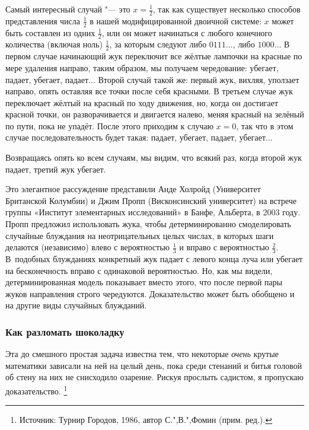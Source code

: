 \documentclass[twoside]{book}
\begin{document}
Самый интересный случай "--- это $x=\tfrac12$, так как существует несколько способов представления числа $\tfrac12$ в нашей модифицированной двоичной системе: $x$ может быть составлен из одних $\tfrac12$, или он может начинаться с любого конечного количества (включая ноль) $\tfrac12$, за которым следуют либо $0111\dots$, либо $1000\dots$
В первом случае начинающий жук переключит все жёлтые лампочки на красные по мере удаления направо, таким образом, мы получаем чередование: убегает, падает, убегает, падает...
Второй случай такой же: первый жук, вихляя, уползает направо, опять оставляя все точки после себя красными.
В третьем случае жук переключает жёлтый на красный по ходу движения, но, когда он достигает красной точки, он разворачивается и двигается налево, меняя красный на зелёный по пути, пока не упадёт.
После этого приходим к случаю $x = 0$, так что в этом случае  последовательность будет такая: падает, убегает, падает, убегает...

Возвращаясь опять ко всем случаям, мы видим, что всякий раз, когда второй жук падает, третий жук убегает.
\heart

Это элегантное рассуждение представили
Анде Холройд (Университет Британской Колумбии) и Джим Пропп (Висконсинский университет) на встрече группы «Институт элементарных исследований» в Банфе, Альберта, в 2003 году. %
Пропп предложил использовать жука, чтобы детерминированно смоделировать случайные блуждания на неотрицательных целых числах, в которых шаги делаются (независимо) влево с вероятностью $\tfrac13$ и вправо с вероятностью $\tfrac23$.
В~подобных блужданиях конкретный жук падает с левого конца луча или убегает на бесконечность вправо с одинаковой вероятностью.
Но, как мы видели, детерминированная модель показывает вместо этого, что после первой пары жуков направления строго чередуются.
Доказательство может быть обобщено и на другие виды случайных блужданий.

\subsubsection*{Как разломать шоколадку}%

Эта до смешного простая задача известна тем, что некоторые \emph{очень} крутые математики зависали на ней на целый день, пока среди  стенаний и битья головой об стену на них не снисходило озарение.
Рискуя прослыть садистом, я пропускаю доказательство.%
\footnote{Источник: Турнир Городов, 1986, автор  С.",В.",Фомин \cite[№97909]{problems} (прим. ред.).}
\end{document}
